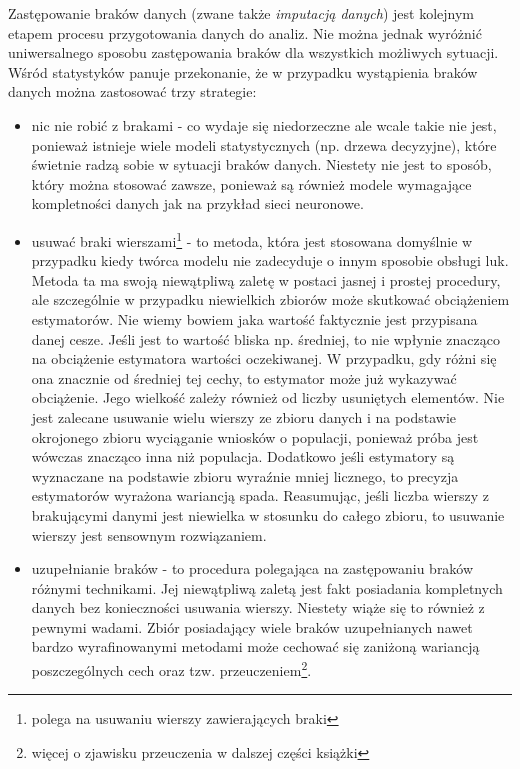 \documentclass[]{book}
\providecommand{\tightlist}{%
  \setlength{\itemsep}{0pt}\setlength{\parskip}{0pt}}
\let\rmarkdownfootnote\footnote%
\def\footnote{\protect\rmarkdownfootnote}
\theoremstyle{plain}
\theoremstyle{definition}
\theoremstyle{definition}
\theoremstyle{definition}
\theoremstyle{definition}
\theoremstyle{remark}
\begin{document}
Zastępowanie braków danych (zwane także \emph{imputacją danych}) jest kolejnym etapem procesu przygotowania danych do analiz. Nie można jednak wyróżnić uniwersalnego sposobu zastępowania braków dla wszystkich możliwych sytuacji. Wśród statystyków panuje przekonanie, że w przypadku wystąpienia braków danych można zastosować trzy strategie:

\begin{itemize}
\tightlist
\item
  nic nie robić z brakami - co wydaje się niedorzeczne ale wcale takie nie jest, ponieważ istnieje wiele modeli statystycznych (np. drzewa decyzyjne), które świetnie radzą sobie w sytuacji braków danych. Niestety nie jest to sposób, który można stosować zawsze, ponieważ są również modele wymagające kompletności danych jak na przykład sieci neuronowe.
\item
  usuwać braki wierszami\footnote{polega na usuwaniu wierszy zawierających braki} - to metoda, która jest stosowana domyślnie w przypadku kiedy twórca modelu nie zadecyduje o innym sposobie obsługi luk. Metoda ta ma swoją niewątpliwą zaletę w postaci jasnej i prostej procedury, ale szczególnie w przypadku niewielkich zbiorów może skutkować obciążeniem estymatorów. Nie wiemy bowiem jaka wartość faktycznie jest przypisana danej cesze. Jeśli jest to wartość bliska np. średniej, to nie wpłynie znacząco na obciążenie estymatora wartości oczekiwanej. W przypadku, gdy różni się ona znacznie od średniej tej cechy, to estymator może już wykazywać obciążenie. Jego wielkość zależy również od liczby usuniętych elementów. Nie jest zalecane usuwanie wielu wierszy ze zbioru danych i na podstawie okrojonego zbioru wyciąganie wniosków o populacji, ponieważ próba jest wówczas znacząco inna niż populacja. Dodatkowo jeśli estymatory są wyznaczane na podstawie zbioru wyraźnie mniej licznego, to precyzja estymatorów wyrażona wariancją spada. Reasumując, jeśli liczba wierszy z brakującymi danymi jest niewielka w stosunku do całego zbioru, to usuwanie wierszy jest sensownym rozwiązaniem.
\item
  uzupełnianie braków - to procedura polegająca na zastępowaniu braków różnymi technikami. Jej niewątpliwą zaletą jest fakt posiadania kompletnych danych bez konieczności usuwania wierszy. Niestety wiąże się to również z pewnymi wadami. Zbiór posiadający wiele braków uzupełnianych nawet bardzo wyrafinowanymi metodami może cechować się zaniżoną wariancją poszczególnych cech oraz tzw. przeuczeniem\footnote{więcej o zjawisku przeuczenia w dalszej części książki}.
\end{itemize}
\end{document}
